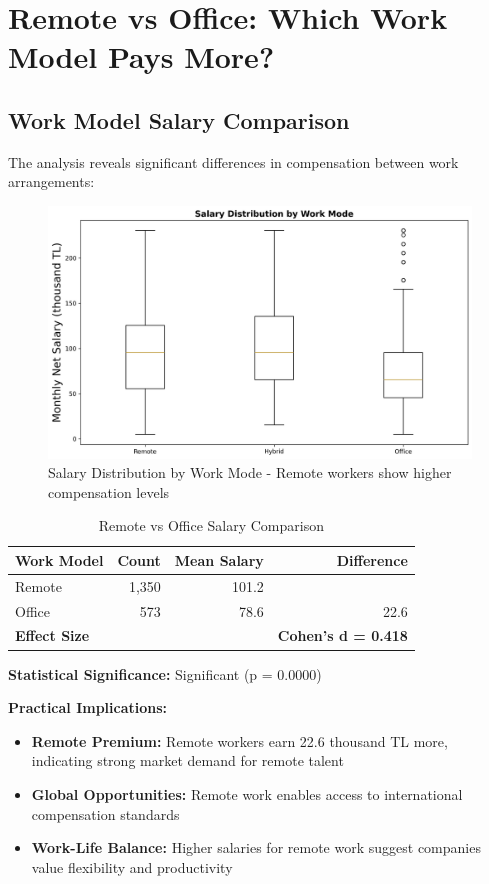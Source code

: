 \documentclass[12pt,a4paper]{article}
\begin{document}
\section{Remote vs Office: Which Work Model Pays More?}

\subsection{Work Model Salary Comparison}
The analysis reveals significant differences in compensation between work arrangements:

\begin{figure}[H]
    \centering
    \includegraphics[width=\textwidth]{figures/boxplot_work_mode.png}
    \caption{Salary Distribution by Work Mode - Remote workers show higher compensation levels}
\end{figure}

\begin{table}[H]
\centering
\begin{tabular}{lrrr}
\toprule
\textbf{Work Model} & \textbf{Count} & \textbf{Mean Salary} & \textbf{Difference} \\
\midrule
Remote & 1,350 & 101.2 & \\
Office & 573 & 78.6 & 22.6 \\
\midrule
\textbf{Effect Size} & & & \textbf{Cohen's d = 0.418} \\
\bottomrule
\end{tabular}
\caption{Remote vs Office Salary Comparison}
\end{table}

\textbf{Statistical Significance:} Significant (p = 0.0000)

\textbf{Practical Implications:}
\begin{itemize}
    \item \textbf{Remote Premium:} Remote workers earn 22.6 thousand TL more, indicating strong market demand for remote talent
    \item \textbf{Global Opportunities:} Remote work enables access to international compensation standards
    \item \textbf{Work-Life Balance:} Higher salaries for remote work suggest companies value flexibility and productivity
\end{itemize}
\end{document}
